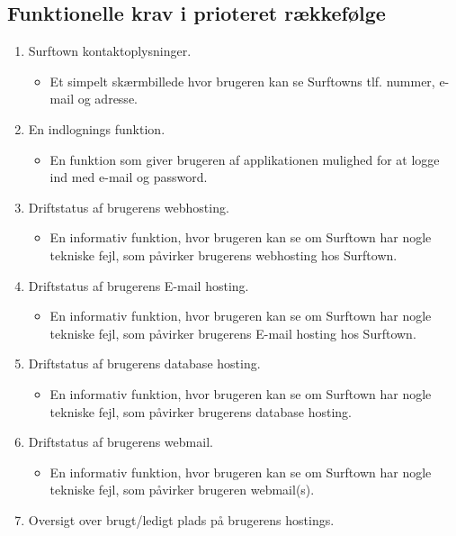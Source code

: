 \documentclass[12pt]{article}
\begin{document}
\subsection{Funktionelle krav i prioteret rækkefølge}
\label{functionlist}
\begin{enumerate}
  \item{Surftown kontaktoplysninger.}
	\begin{itemize}
		\item{Et simpelt skærmbillede hvor brugeren kan se Surftowns tlf. nummer, e-mail og adresse.}
	\end{itemize}
  \item{En indlognings funktion.}
	\begin{itemize}
		\item{En funktion som giver brugeren af applikationen mulighed for at logge ind med e-mail og password.}
	\end{itemize}
  \item{Driftstatus af brugerens webhosting.}
	\begin{itemize}
		\item{En informativ funktion, hvor brugeren kan se om Surftown har nogle tekniske fejl, som påvirker brugerens webhosting hos Surftown.}
	\end{itemize}
  \item{Driftstatus af brugerens E-mail hosting.}
	\begin{itemize}
		\item{En informativ funktion, hvor brugeren kan se om Surftown har nogle tekniske fejl, som påvirker brugerens E-mail hosting hos Surftown.}
	\end{itemize}
  \item{Driftstatus af brugerens database hosting.}
	\begin{itemize}
		\item{En informativ funktion, hvor brugeren kan se om Surftown har nogle tekniske fejl, som påvirker brugerens database hosting.}
	\end{itemize}
  \item{Driftstatus af brugerens webmail.}
	\begin{itemize}
		\item{En informativ funktion, hvor brugeren kan se om Surftown har nogle tekniske fejl, som påvirker brugeren webmail(s).}
	\end{itemize}
  \item{Oversigt over brugt/ledigt plads på brugerens hostings.}
	\begin{itemize}

\end{itemize}
\end{enumerate}
\end{document}
